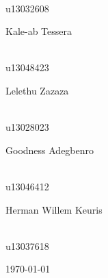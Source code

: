 \documentclass[a4paper,12pt]{report}
\begin{document}
\begin{titlepage}
\begin{center}
\begin{minipage}{0.4\textwidth}
\end{minipage}
\begin{minipage}{0.4\textwidth}
\begin{flushright} \large
\emph{} \\
u13032608
\end{flushright}
\end{minipage}
\begin{minipage}{0.4\textwidth}
\begin{flushleft} \large
Kale-ab {Tessera}
\end{flushleft}
\end{minipage}
\begin{minipage}{0.4\textwidth}
\begin{flushright} \large
\emph{} \\
u13048423
\end{flushright}
\end{minipage}
\begin{minipage}{0.4\textwidth}
\begin{flushleft} \large
Lelethu {Zazaza}
\end{flushleft}
\end{minipage}
\begin{minipage}{0.4\textwidth}
\begin{flushright} \large
\emph{} \\
u13028023
\end{flushright}
\end{minipage}
\begin{minipage}{0.4\textwidth}
\begin{flushleft} \large
Goodness {Adegbenro}
\end{flushleft}
\end{minipage}
\begin{minipage}{0.4\textwidth}
\begin{flushright} \large
\emph{} \\
u13046412
\end{flushright}
\end{minipage}
\begin{minipage}{0.4\textwidth}
\begin{flushleft} \large
Herman Willem {Keuris}
\end{flushleft}
\end{minipage}
\begin{minipage}{0.4\textwidth}
\begin{flushright} \large
\emph{} \\
u13037618
\end{flushright}
\end{minipage}
\vfill
{\large \today}
\end{center}
\end{titlepage}
\footnotesize

\normalsize
\end{document}
